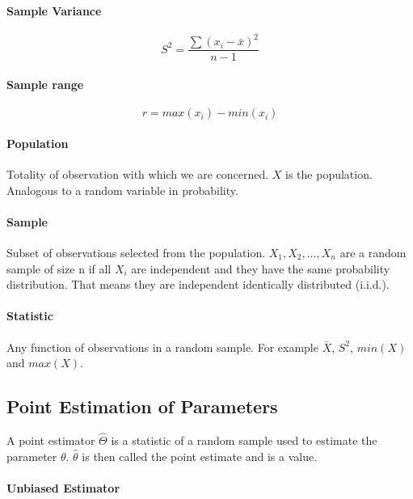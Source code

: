 \documentclass[a4paper, 10pt]{article}
\begin{document}
	\paragraph{Sample Variance}

	\begin{equation*}
		S^2=\frac{\sum (x_i-\bar{x})^2}{n-1}
	\end{equation*}

	\paragraph{Sample range}

	\begin{equation*}
		r=max(x_i)-min(x_i)
	\end{equation*}

	\paragraph{Population}

	Totality of observation with which we are concerned. \(X\) is the population. Analogous to a random variable in probability.

	\paragraph{Sample}

	Subset of observations selected from the population. \(X_1, X_2,\ldots,X_n\) are a random sample of size n if all \(X_i\) are independent and they have the same probability distribution. That means they are independent identically distributed (i.i.d.).

	\paragraph{Statistic}

	Any function of observations in a random sample. For example \(\bar{X}\), \(S^2\), \(min(X)\) and \(max(X)\).

	\subsection{Point Estimation of Parameters}

	A point estimator \(\hat{\Theta}\) is a statistic of a random sample used to estimate the parameter \(\theta\). \(\hat{\theta}\) is then called the point estimate and is a value.

	\paragraph{Unbiased Estimator}
\end{document}
